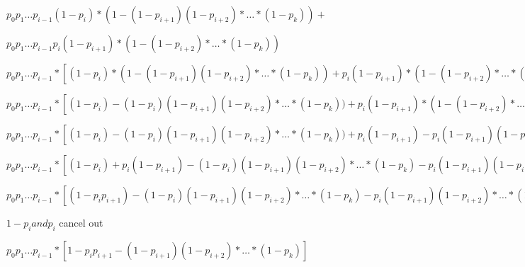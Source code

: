 \documentclass[fleqn]{article}
\begin{document}
$p_0p_1\dots p_{i-1} (1 - p_i) * (1 - (1-p_{i+1})(1-p_{i+2})*\dots*(1-p_k)) + $ \newline

$p_0p_1\dots p_{i-1} p_i (1 - p_{i+1}) * (1 - (1-p_{i+2})*\dots*(1-p_k))$ \newline

$p_0p_1\dots p_{i-1} * [ (1 - p_i) * (1 - (1-p_{i+1})(1-p_{i+2})*\dots*(1-p_k)) + p_i (1 - p_{i+1}) * (1 - (1-p_{i+2})*\dots*(1-p_k)) ] $ \newline

$p_0p_1\dots p_{i-1} * [ (1 - p_i) - (1 - p_i)(1-p_{i+1})(1-p_{i+2})*\dots*(1-p_k)) + p_i (1 - p_{i+1}) * (1 - (1-p_{i+2})*\dots*(1-p_k)) ] $ \newline

$p_0p_1\dots p_{i-1} * [ (1 - p_i) - (1 - p_i)(1-p_{i+1})(1-p_{i+2})*\dots*(1-p_k)) + p_i (1 - p_{i+1})   - p_i (1 - p_{i+1})(1-p_{i+2})*\dots*(1-p_k)) ] $ \newline

$p_0p_1\dots p_{i-1} * [ (1 - p_i) + p_i (1 - p_{i+1}) - (1 - p_i)(1-p_{i+1})(1-p_{i+2})*\dots*(1-p_k)    - p_i (1 - p_{i+1})(1-p_{i+2})*\dots*(1-p_k)) ] $ \newline

$p_0p_1\dots p_{i-1} * [ (1 - p_ip_{i+1}) - (1 - p_i)(1-p_{i+1})(1-p_{i+2})*\dots*(1-p_k)    - p_i (1 - p_{i+1})(1-p_{i+2})*\dots*(1-p_k)) ] $ \newline

$1-p_i and p_i$ cancel out \newline

$p_0p_1\dots p_{i-1} * [ 1 - p_ip_{i+1} -(1-p_{i+1})(1-p_{i+2})*\dots*(1-p_k)  ] $ \newline
\end{document}

